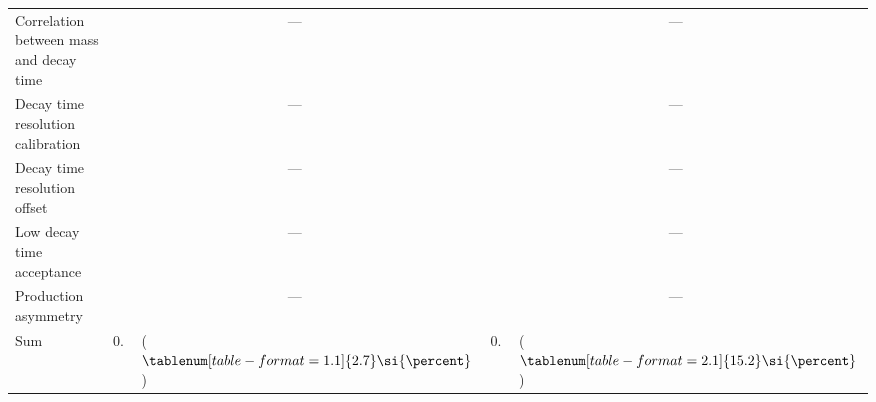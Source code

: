 \begin{table}[h]
\begin{tabular}{lrlrl}
    {Correlation between mass and decay time}&  \multicolumn{2}{c}{---}               &  \multicolumn{2}{c}{---}               \\
    {Decay time resolution calibration}      &  \multicolumn{2}{c}{---}               &  \multicolumn{2}{c}{---}               \\
    {Decay time resolution offset}           &  \multicolumn{2}{c}{---}               &  \multicolumn{2}{c}{---}               \\
    {Low decay time acceptance}              &  \multicolumn{2}{c}{---}               &  \multicolumn{2}{c}{---}               \\
    {Production asymmetry}                   &  \multicolumn{2}{c}{---}               &  \multicolumn{2}{c}{---}               \\
    \midrule
    Sum                                            &  $0.020$        & ($\tablenum[table-format = 1.1]{2.7}\si{\percent}$) & $0.005$          & ($\tablenum[table-format = 2.1]{15.2}\si{\percent}$)\\
    \bottomrule
  \end{tabular}
\end{table}
